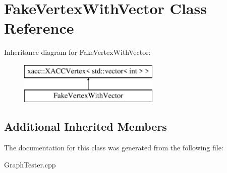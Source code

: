 \hypertarget{a01579}{}\section{Fake\+Vertex\+With\+Vector Class Reference}
\label{a01579}
Inheritance diagram for Fake\+Vertex\+With\+Vector\+:\begin{figure}[H]
\begin{center}
\leavevmode
\includegraphics[height=2.000000cm]{a01579}
\end{center}
\end{figure}
\subsection*{Additional Inherited Members}


The documentation for this class was generated from the following file\+:\begin{DoxyCompactItemize}
\item 
Graph\+Tester.\+cpp\end{DoxyCompactItemize}
